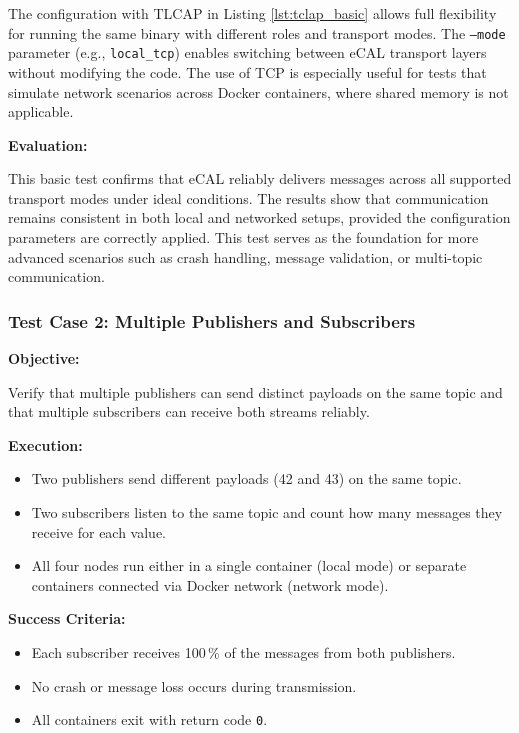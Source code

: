 \vspace{0.4em}
The configuration with TLCAP in Listing \ref{lst:tclap_basic} allows full flexibility for running the same binary with different roles and transport modes. The \texttt{--mode} parameter (e.g., \texttt{local\_tcp}) enables switching between eCAL transport layers without modifying the code. The use of TCP is especially useful for tests that simulate network scenarios across Docker containers, where shared memory is not applicable.

\vspace{1em}

\textbf{Evaluation:}

\vspace{0.4em}
This basic test confirms that eCAL reliably delivers messages across all supported transport modes under ideal conditions. The results show that communication remains consistent in both local and networked setups, provided the configuration parameters are correctly applied. This test serves as the foundation for more advanced scenarios such as crash handling, message validation, or multi-topic communication.


\vspace{1em}
\vspace{1em}
\subsubsection{Test Case 2: Multiple Publishers and Subscribers}
\label{sec:tc2}

\textbf{Objective:}

\vspace{0.4em}
Verify that multiple publishers can send distinct payloads on the same topic and that multiple subscribers can receive both streams reliably.

\vspace{0.5em}
\textbf{Execution:}
\begin{itemize}
	\item Two publishers send different payloads (42 and 43) on the same topic.
	\item Two subscribers listen to the same topic and count how many messages they receive for each value.
	\item All four nodes run either in a single container (local mode) or separate containers connected via Docker network (network mode).
\end{itemize}

\textbf{Success Criteria:}
\begin{itemize}
	\item Each subscriber receives 100\,\% of the messages from both publishers.
	\item No crash or message loss occurs during transmission.
	\item All containers exit with return code \texttt{0}.
\end{itemize}

